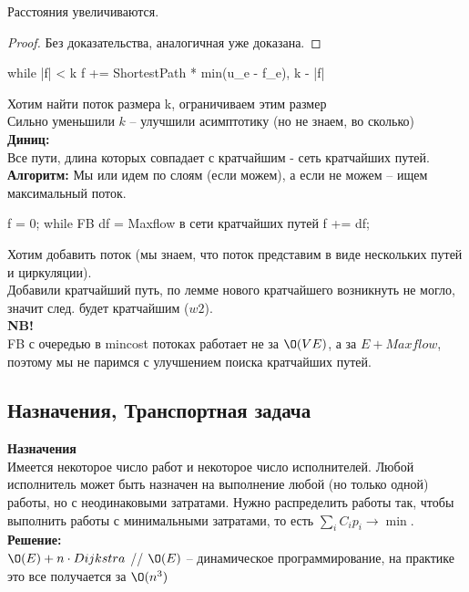 \begin{lemma}
	Расстояния увеличиваются.
\end{lemma}
\begin{proof}
	Без доказательства, аналогичная уже доказана.
\end{proof}

\begin{cppcode}
	while |f| < k
		f += ShortestPath * min(u_e - f_e), k - |f| 
\end{cppcode}
Хотим найти поток размера k, ограничиваем этим размер\\
Сильно уменьшили $k$ -- улучшили асимптотику (но не знаем, во сколько)\\

{\bfseries Диниц:}\\
Все пути, длина которых совпадает с кратчайшим - сеть кратчайших путей.\\
{\bfseries Алгоритм:}
Мы или идем по слоям (если можем), а если не можем -- ищем максимальный поток.
\begin{cppcode}
	f = 0;
	while FB
		df = Maxflow в сети кратчайших путей
	f += df;
\end{cppcode}

Хотим добавить поток (мы знаем, что поток представим в виде нескольких путей и циркуляции).\\
Добавили кратчайший путь, по лемме нового кратчайшего возникнуть не могло, значит след. будет кратчайшим ($w2$).\\
{\bfseries NB!}\\
FB с очередью в mincost потоках работает не за $\O(VE)$, а за $E + Maxflow$, поэтому мы не паримся с улучшением поиска кратчайших путей.\\

\subsection{Назначения, Транспортная задача}
{\bfseries Назначения} \\
Имеется некоторое число работ и некоторое число исполнителей. Любой исполнитель может быть назначен на выполнение любой (но только одной) работы, но с неодинаковыми затратами. 
Нужно распределить работы так, чтобы выполнить работы с минимальными затратами, то есть $\sum_i C_ip_i \to \min$.\\
{\bfseries Решение:}\\
$\O(E) + n\cdot Dijkstra$ // $\O(E)$ -- динамическое программирование, на практике это все получается за $\O(n^3)$\\

